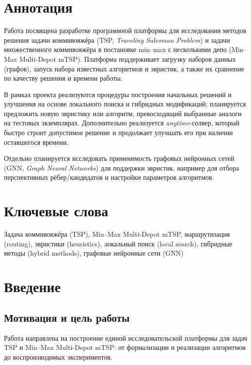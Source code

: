 \documentclass[a4paper,12pt]{extarticle}
\begin{document}
\newpage
\setcounter{page}{2}

{
	\hypersetup{linkcolor=black}
	\tableofcontents
}

\newpage

\newpage
\section*{Аннотация}   %
Работа посвящена разработке программной платформы для исследования методов решения задачи коммивояжёра (TSP, \emph{Traveling Salesman Problem}) и задачи множественного коммивояжёра в постановке min--max с несколькими депо (Min--Max Multi-Depot mTSP). Платформа поддерживает загрузку наборов данных (графов), запуск набора известных алгоритмов и эвристик, а также их сравнение по качеству решения и времени работы.

В рамках проекта реализуются процедуры построения начальных решений и улучшения на основе локального поиска и гибридных модификаций; планируется предложить новую эвристику или алгоритм, превосходящий выбранные аналоги на тестовых экземплярах. Дополнительно реализуется \emph{anytime}-солвер, который быстро строит допустимое решение и продолжает улучшать его при наличии оставшегося времени.

Отдельно планируется исследовать применимость графовых нейронных сетей (GNN, \emph{Graph Neural Networks}) для поддержки эвристик, например для отбора перспективных рёбер/кандидатов и настройки параметров алгоритмов.


\section*{Ключевые слова}
Задача коммивояжёра (TSP), Min--Max Multi-Depot mTSP, маршрутизация (routing), эвристики (heuristics), локальный поиск (local search), гибридные методы (hybrid methods), графовые нейронные сети (GNN)
\pagebreak


\section{Введение}

\subsection{Мотивация и цель работы}
Работа направлена на построение единой исследовательской платформы для задач TSP и Min--Max Multi-Depot mTSP: от формализации и реализации алгоритмов до воспроизводимых экспериментов.
\end{document}
